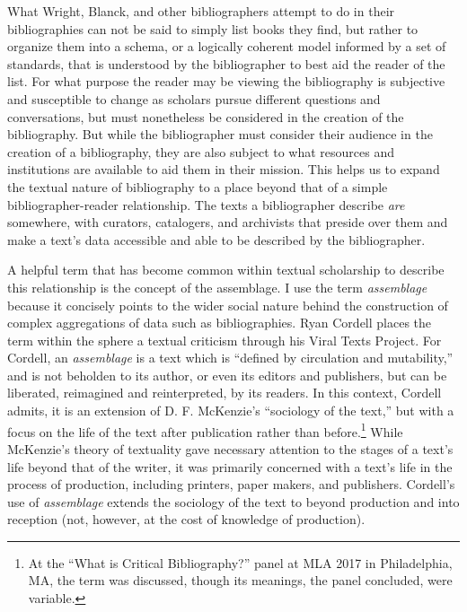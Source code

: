 What Wright, Blanck, and other bibliographers attempt to do in their bibliographies can not be said to simply list books they find, but rather to organize them into a schema, or a logically coherent model informed by a set of standards, that is understood by the bibliographer to best aid the reader of the list. For what purpose the reader may be viewing the bibliography is subjective and susceptible to change as scholars pursue different questions and conversations, but must nonetheless be considered in the creation of the bibliography. But while the bibliographer must consider their audience in the creation of a bibliography, they are also subject to what resources and institutions are available to aid them in their mission. This helps us to expand the textual nature of bibliography to a place beyond that of a simple bibliographer-reader relationship. The texts a bibliographer describe \textit{are} somewhere, with curators, catalogers, and archivists that preside over them and make a text's data accessible and able to be described by the bibliographer.

A helpful term that has become common within textual scholarship to describe this relationship is the concept of the assemblage. I use the term \textit{assemblage} because it concisely points to the wider social nature behind the construction of complex aggregations of data such as bibliographies. Ryan Cordell places the term within the sphere a textual criticism through his Viral Texts Project.\autocite{cordell_reprinting_2015} For Cordell, an \textit{assemblage} is a text which is ``defined by circulation and mutability,'' and is not beholden to its author, or even its editors and publishers, but can be liberated, reimagined and reinterpreted, by its readers. \autocite{cordell_two_2016} In this context, Cordell admits, it is an extension of D. F. McKenzie's ``sociology of the text,'' but with a focus on the life of the text after publication rather than before.\footnote{At the ``What is Critical Bibliography?'' panel at MLA 2017 in Philadelphia, MA, the term was discussed, though its meanings, the panel concluded, were variable.} While McKenzie's theory of textuality gave necessary attention to the stages of a text's life beyond that of the writer, it was primarily concerned with a text's life in the process of production, including printers, paper makers, and publishers. Cordell's use of \textit{assemblage} extends the sociology of the text to beyond production and into reception (not, however, at the cost of knowledge of production). 

